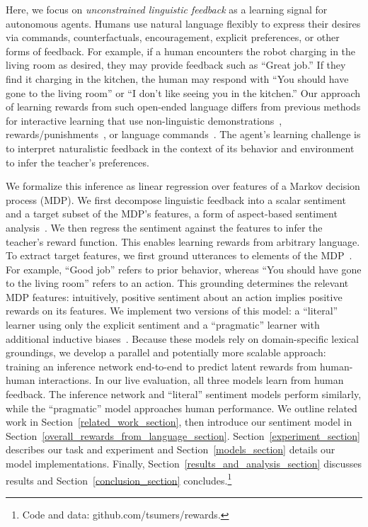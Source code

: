 \documentclass[letterpaper]{article} %
\begin{document}
Here, we focus on \emph{unconstrained linguistic feedback} as a learning signal for autonomous agents. Humans use natural language flexibly to express their desires via commands, counterfactuals, encouragement, explicit preferences, or other forms of feedback. For example, if a human encounters the robot charging in the living room as desired, they  may provide feedback such as ``Great job.'' If they find it charging in the kitchen, the human may respond with ``You should have gone to the living room'' or ``I don't like seeing you in the kitchen.'' Our approach of learning rewards from such open-ended language differs from previous methods for interactive learning that use non-linguistic demonstrations~\cite{abbeel2004apprenticeship,argall2009survey,ho2016showing}, rewards/punishments~\cite{Knox2009Interactively, macglashan2017interactive, christiano2017deep}, or language commands~\cite{Tellex2011, Wang_2016, Tellex2020}. The agent's learning challenge is to interpret naturalistic feedback in the context of its behavior and environment to infer the teacher's preferences.

We formalize this inference as linear regression over features of a Markov decision process (MDP). We first decompose linguistic feedback into a scalar sentiment and a target subset of the MDP's features, a form of aspect-based sentiment analysis~\cite{hu2004mining, liu2020sentiment}. We then regress the sentiment against the features to infer the teacher's reward function. This enables learning rewards from arbitrary language. To extract target features, we first ground utterances to elements of the MDP~\cite{harnad1990symbol, mooney2008learning}. For example, ``Good job'' refers to prior behavior, whereas ``You should have gone to the living room'' refers to an action. This grounding determines the relevant MDP features: intuitively, positive sentiment about an action implies positive rewards on its features. We implement two versions of this model: a ``literal'' learner using only the explicit sentiment and a ``pragmatic'' learner with additional inductive biases~\cite{grice1975logic}. Because these models rely on domain-specific lexical groundings, we develop a parallel and potentially more scalable approach: training an inference network end-to-end to predict latent rewards from human-human interactions. In our live evaluation, all three models learn from human feedback. The inference network and ``literal'' sentiment models perform similarly, while the ``pragmatic'' model approaches human performance. We outline related work in Section~\ref{related_work_section}, then introduce our sentiment model in Section~\ref{overall_rewards_from_language_section}. Section~\ref{experiment_section} describes our task and experiment and Section~\ref{models_section} details our model implementations. Finally, Section~\ref{results_and_analysis_section} discusses results and Section~\ref{conclusion_section} concludes.\footnote{Code and data: github.com/tsumers/rewards.}
\end{document}
